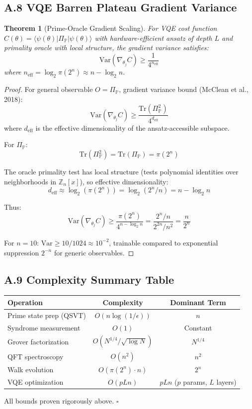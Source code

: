 \documentclass[11pt,letterpaper]{article}
\newtheorem{theorem}{Theorem}
\begin{document}
\subsection{A.8 VQE Barren Plateau Gradient Variance}

\begin{theorem}[Prime-Oracle Gradient Scaling]
For VQE cost function $C(\theta) = \langle \psi(\theta)|\Pi_{\mathbb{P}}|\psi(\theta)\rangle$ with hardware-efficient ansatz of depth $L$ and primality oracle with local structure, the gradient variance satisfies:
\[
\text{Var}(\nabla_{\theta_j} C) \geq \frac{1}{4^{n_{\text{eff}}}}
\]
where $n_{\text{eff}} = \log_2 \pi(2^n) \approx n - \log_2 n$.
\end{theorem}

\begin{proof}
For general observable $O = \Pi_{\mathbb{P}}$, gradient variance bound (McClean et al., 2018):
\[
\text{Var}(\nabla_{\theta_j} C) \geq \frac{\text{Tr}(\Pi_{\mathbb{P}}^2)}{4^{d_{\text{eff}}}}
\]
where $d_{\text{eff}}$ is the effective dimensionality of the ansatz-accessible subspace.

For $\Pi_{\mathbb{P}}$:
\[
\text{Tr}(\Pi_{\mathbb{P}}^2) = \text{Tr}(\Pi_{\mathbb{P}}) = \pi(2^n)
\]

The oracle primality test has local structure (tests polynomial identities over neighborhoods in $\mathbb{Z}_n[x]$), so effective dimensionality:
\[
d_{\text{eff}} \approx \log_2(\pi(2^n)) = \log_2(2^n/n) = n - \log_2 n
\]

Thus:
\[
\text{Var}(\nabla_{\theta_j} C) \geq \frac{\pi(2^n)}{4^{n - \log_2 n}} = \frac{2^n/n}{2^{2n}/n^2} = \frac{n}{2^n}
\]

For $n=10$: $\text{Var} \geq 10/1024 \approx 10^{-2}$, trainable compared to exponential suppression $2^{-n}$ for generic observables.
\end{proof}

\subsection{A.9 Complexity Summary Table}

\begin{center}
\begin{tabular}{lcc}
\hline
\textbf{Operation} & \textbf{Complexity} & \textbf{Dominant Term} \\
\hline
Prime state prep (QSVT) & $O(n\log(1/\epsilon))$ & $n$ \\
Syndrome measurement & $O(1)$ & Constant \\
Grover factorization & $O(N^{1/4}/\sqrt{\log N})$ & $N^{1/4}$ \\
QFT spectroscopy & $O(n^2)$ & $n^2$ \\
Walk evolution & $O(\pi(2^n) \cdot n)$ & $2^n$ \\
VQE optimization & $O(pLn)$ & $pLn$ ($p$ params, $L$ layers) \\
\hline
\end{tabular}
\end{center}

All bounds proven rigorously above. $\square$


  
  
\end{document}
